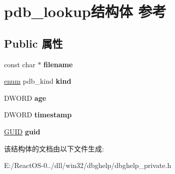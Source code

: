 \hypertarget{structpdb__lookup}{}\section{pdb\+\_\+lookup结构体 参考}
\label{structpdb__lookup}
\subsection*{Public 属性}
\begin{DoxyCompactItemize}
\item 
\mbox{\label{structpdb__lookup_a072e0b26dc233e31e2587c279f223901}} 
const char $\ast$ {\bfseries filename}
\item 
\mbox{\label{structpdb__lookup_a456cabee93e09b4c7c599efe584e59f0}} 
\hyperlink{interfaceenum}{enum} pdb\+\_\+kind {\bfseries kind}
\item 
\mbox{\label{structpdb__lookup_a270f8ce74a50df4a2200e69ee200e923}} 
D\+W\+O\+RD {\bfseries age}
\item 
\mbox{\label{structpdb__lookup_a3cfa50bc6cc949211cf467aacf01d797}} 
D\+W\+O\+RD {\bfseries timestamp}
\item 
\mbox{\label{structpdb__lookup_a9bbac5b866491288e01b4a9f1b4b94fd}} 
\hyperlink{interface_g_u_i_d}{G\+U\+ID} {\bfseries guid}
\end{DoxyCompactItemize}


该结构体的文档由以下文件生成\+:\begin{DoxyCompactItemize}
\item 
E\+:/\+React\+O\+S-\/0../dll/win32/dbghelp/dbghelp\+\_\+private.\+h\end{DoxyCompactItemize}
